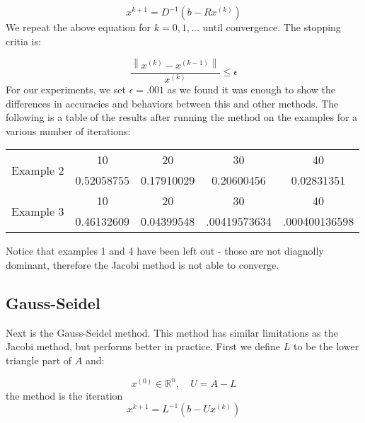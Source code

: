 \documentclass[11pt]{article}	%
\newcommand\norm[1]{\left\lVert#1\right\rVert}
\begin{document}
    \begin{equation}\label{eq:jacobi-eq-1}
        x^{k+1} = D^{-1}(b- Rx^{(k)})
    \end{equation}
    We repeat the above equation for $k = 0, 1, ...$ until convergence. The stopping critia is:

    \begin{equation}
        \frac{\norm{x^{(k)} - x^{(k-1)}}}{x^{(k)}} \leq \epsilon
    \end{equation}
    For our experiments, we set $\epsilon = .001$ as we found it was enough to show the differences in accuracies and behaviors between this and other methods. The following is a table of the results after running the method on the examples for a various number of iterations:
    \begin{center}
        \begin{tabular}{||c|c|c|c|c||}
            \hline
            \multirow{2}{5em}{Example 2} & 10 & 20 & 30 & 40 \\ [.25em]
            & 0.52058755 & 0.17910029 & 0.20600456 & 0.02831351 \\ [.25em]
            \hline \hline
            \multirow{2}{5em}{Example 3} & 10 & 20 & 30 & 40 \\ [.25em]
            & 0.46132609 & 0.04399548 & .00419573634 & .000400136598 \\ [.25em]
            \hline
        \end{tabular}
    \end{center}

    Notice that examples 1 and 4 have been left out - those are not diagnolly dominant, therefore the Jacobi method
    is not able to converge.

\subsection{Gauss-Seidel}
Next is the Gauss-Seidel method. This method has similar limitations as the Jacobi method, but performs better in practice.
First we define $L$ to be the lower triangle part of $A$ and:

\begin{equation}\label{eq:gauss-seidel-eq-1}
    x^{(0)}\in {\mathbb R}^n, \quad U = A - L
\end{equation}
the method is the iteration
\begin{equation}\label{eq:gauss-seidel-eq-2}
    x^{k+1} = L^{-1}(b - Ux^{(k)})
\end{equation}
\end{document}
